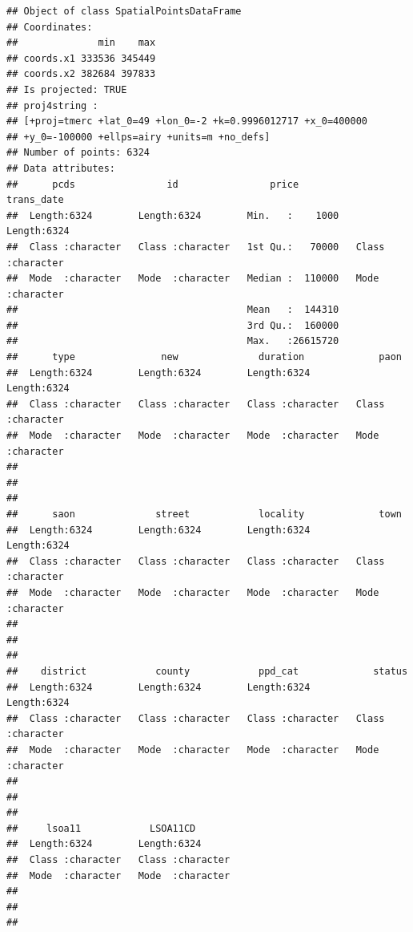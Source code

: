 \documentclass[
]{book}
\begin{document}
\begin{verbatim}
## Object of class SpatialPointsDataFrame
## Coordinates:
##              min    max
## coords.x1 333536 345449
## coords.x2 382684 397833
## Is projected: TRUE 
## proj4string :
## [+proj=tmerc +lat_0=49 +lon_0=-2 +k=0.9996012717 +x_0=400000
## +y_0=-100000 +ellps=airy +units=m +no_defs]
## Number of points: 6324
## Data attributes:
##      pcds                id                price           trans_date       
##  Length:6324        Length:6324        Min.   :    1000   Length:6324       
##  Class :character   Class :character   1st Qu.:   70000   Class :character  
##  Mode  :character   Mode  :character   Median :  110000   Mode  :character  
##                                        Mean   :  144310                     
##                                        3rd Qu.:  160000                     
##                                        Max.   :26615720                     
##      type               new              duration             paon          
##  Length:6324        Length:6324        Length:6324        Length:6324       
##  Class :character   Class :character   Class :character   Class :character  
##  Mode  :character   Mode  :character   Mode  :character   Mode  :character  
##                                                                             
##                                                                             
##                                                                             
##      saon              street            locality             town          
##  Length:6324        Length:6324        Length:6324        Length:6324       
##  Class :character   Class :character   Class :character   Class :character  
##  Mode  :character   Mode  :character   Mode  :character   Mode  :character  
##                                                                             
##                                                                             
##                                                                             
##    district            county            ppd_cat             status         
##  Length:6324        Length:6324        Length:6324        Length:6324       
##  Class :character   Class :character   Class :character   Class :character  
##  Mode  :character   Mode  :character   Mode  :character   Mode  :character  
##                                                                             
##                                                                             
##                                                                             
##     lsoa11            LSOA11CD        
##  Length:6324        Length:6324       
##  Class :character   Class :character  
##  Mode  :character   Mode  :character  
##                                       
##                                       
## 
\end{verbatim}
\end{document}
